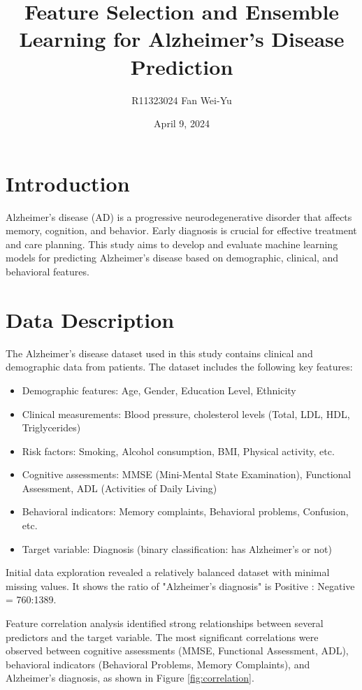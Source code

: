 \documentclass[12pt]{article}
\title{Feature Selection and Ensemble Learning for Alzheimer's Disease Prediction}
\author{R11323024 Fan Wei-Yu}
\date{April 9, 2024}
\begin{document}
\maketitle

\section{Introduction}
Alzheimer's disease (AD) is a progressive neurodegenerative disorder that affects memory, cognition, and behavior. Early diagnosis is crucial for effective treatment and care planning. This study aims to develop and evaluate machine learning models for predicting Alzheimer's disease based on demographic, clinical, and behavioral features.

\section{Data Description}
\label{sec:data}

The Alzheimer's disease dataset used in this study contains clinical and demographic data from patients. The dataset includes the following key features:

\begin{itemize}
    \item Demographic features: Age, Gender, Education Level, Ethnicity
    \item Clinical measurements: Blood pressure, cholesterol levels (Total, LDL, HDL, Triglycerides)
    \item Risk factors: Smoking, Alcohol consumption, BMI, Physical activity, etc.
    \item Cognitive assessments: MMSE (Mini-Mental State Examination), Functional Assessment, ADL (Activities of Daily Living)
    \item Behavioral indicators: Memory complaints, Behavioral problems, Confusion, etc.
    \item Target variable: Diagnosis (binary classification: has Alzheimer's or not)
\end{itemize}

Initial data exploration revealed a relatively balanced dataset with minimal missing values. It shows the ratio of "Alzheimer's diagnosis" is Positive : Negative = 760:1389.

Feature correlation analysis identified strong relationships between several predictors and the target variable. The most significant correlations were observed between cognitive assessments (MMSE, Functional Assessment, ADL), behavioral indicators (Behavioral Problems, Memory Complaints), and Alzheimer's diagnosis, as shown in Figure \ref{fig:correlation}.
\end{document}
